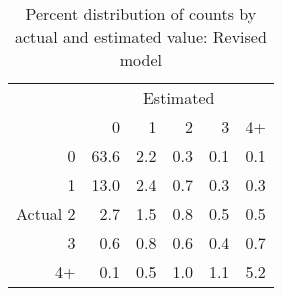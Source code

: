 \begin{table}[ht]
\centering
\caption{Percent distribution of counts by actual and estimated value: Revised model} 
\label{tab:confusion_matrix_Revised}
\begin{tabular}{rrrrrr}
  \hline & \multicolumn{5}{c}{Estimated}\\ & 0 & 1 & 2 & 3 & 4+ \\ 
          0 & 63.6 & 2.2 & 0.3 & 0.1 & 0.1 \\ 
           1 & 13.0 & 2.4 & 0.7 & 0.3 & 0.3 \\ 
  Actual   2 & 2.7 & 1.5 & 0.8 & 0.5 & 0.5 \\ 
           3 & 0.6 & 0.8 & 0.6 & 0.4 & 0.7 \\ 
           4+ & 0.1 & 0.5 & 1.0 & 1.1 & 5.2 \\ 
   \hline
\end{tabular}
\end{table}
